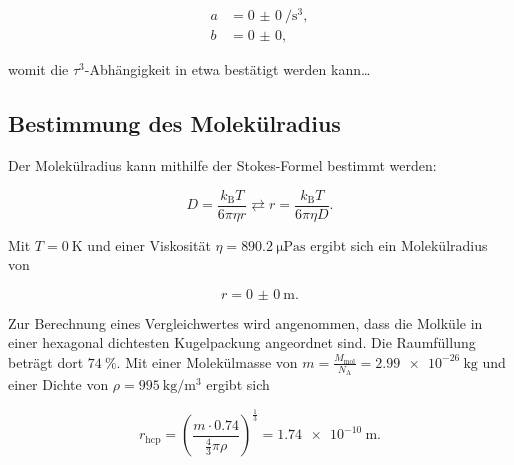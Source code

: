 \begin{align*}
  a &= \SI{0(0)}{\per\second^3},\\
  b &= \num{0(0)},
\end{align*}

womit die $\tau^3$-Abhängigkeit in etwa bestätigt werden kann\dots

\subsection{Bestimmung des Molekülradius}

Der Molekülradius kann mithilfe der Stokes-Formel bestimmt werden:

\begin{equation*}
  D = \frac{k_\text{B}T}{6\pi\eta r} \rightleftarrows r = \frac{k_\text{B}T}{6 \pi\eta D}.
\end{equation*}

Mit $T = \SI{0}{\kelvin}$ und einer Viskosität $\eta = \SI{890.2}{\micro\pascal\second}$\cite{vis} ergibt sich ein Molekülradius
von

\begin{equation}
  r = \SI{0(0)}{\metre}.
\end{equation}

Zur Berechnung eines Vergleichwertes wird angenommen, dass die Molküle in einer hexagonal dichtesten Kugelpackung angeordnet 
sind. Die Raumfüllung beträgt dort $\SI{74}{\percent}$. Mit einer Molekülmasse von $m = \frac{M_\text{mol}}{N_\text{A}} = \SI{2.99e-26}{\kilo\gram}$
und einer Dichte von $\rho=\SI{995}{\kilo\gram\per\metre^3}$\cite{rho} ergibt sich

\begin{equation}
  r_\text{hcp} = \left(\frac{m\cdot 0.74}{\frac{4}{3}\pi\rho}\right)^{\frac{1}{3}} = \SI{1.74e-10}{\metre}.
\end{equation}


